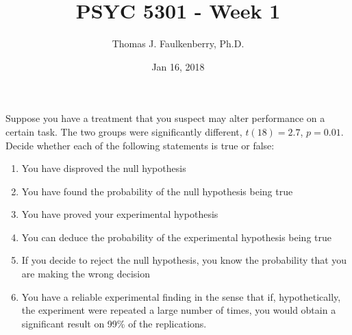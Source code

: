 \documentclass{foils}
\author{Thomas J. Faulkenberry, Ph.D.}
\date{Jan 16, 2018}
\title{PSYC 5301 - Week 1}
\begin{document}
\maketitle

\label{sec-1}
Suppose you have a treatment that you suspect may alter performance on a certain task.  The two groups were significantly different, $t(18)=2.7$, $p=0.01$.  Decide whether each of the following statements is true or false:
\begin{enumerate}
\item You have disproved the null hypothesis
\item You have found the probability of the null hypothesis being true
\item You have proved your experimental hypothesis
\item You can deduce the probability of the experimental hypothesis being true
\item If you decide to reject the null hypothesis, you know the probability that you are making the wrong decision
\item You have a reliable experimental finding in the sense that if, hypothetically, the experiment were repeated a large number of times, you would obtain a significant result on 99\% of the replications.
\end{enumerate}
\end{document}
